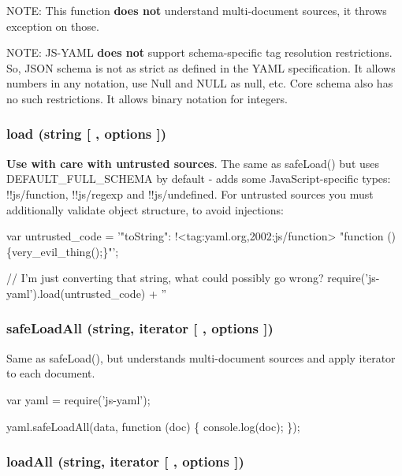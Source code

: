 N\+O\+TE\+: This function {\bfseries does not} understand multi-\/document sources, it throws exception on those.

N\+O\+TE\+: J\+S-\/\+Y\+A\+ML {\bfseries does not} support schema-\/specific tag resolution restrictions. So, J\+S\+ON schema is not as strict as defined in the Y\+A\+ML specification. It allows numbers in any notation, use {\ttfamily Null} and {\ttfamily N\+U\+LL} as {\ttfamily null}, etc. Core schema also has no such restrictions. It allows binary notation for integers.

\subsubsection*{load (string \mbox{[} , options \mbox{]})}

{\bfseries Use with care with untrusted sources}. The same as {\ttfamily safe\+Load()} but uses {\ttfamily D\+E\+F\+A\+U\+L\+T\+\_\+\+F\+U\+L\+L\+\_\+\+S\+C\+H\+E\+MA} by default -\/ adds some Java\+Script-\/specific types\+: {\ttfamily !!js/function}, {\ttfamily !!js/regexp} and {\ttfamily !!js/undefined}. For untrusted sources you must additionally validate object structure, to avoid injections\+:


\begin{DoxyCode}
var untrusted\_code = '"toString": !<tag:yaml.org,2002:js/function> "function ()\{very\_evil\_thing();\}"';

// I'm just converting that string, what could possibly go wrong?
require('js-yaml').load(untrusted\_code) + ''
\end{DoxyCode}


\subsubsection*{safe\+Load\+All (string, iterator \mbox{[} , options \mbox{]})}

Same as {\ttfamily safe\+Load()}, but understands multi-\/document sources and apply {\ttfamily iterator} to each document.


\begin{DoxyCode}
var yaml = require('js-yaml');

yaml.safeLoadAll(data, function (doc) \{
  console.log(doc);
\});
\end{DoxyCode}


\subsubsection*{load\+All (string, iterator \mbox{[} , options \mbox{]})}

